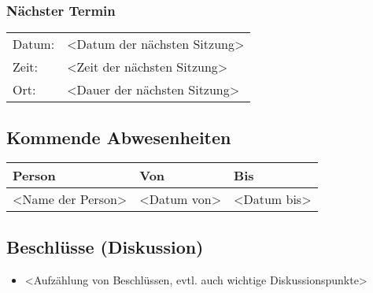 \subsubsection*{Nächster Termin}

\begin{tabular}{p{4cm} p{12cm}}
    Datum: & <Datum der nächsten Sitzung> \\
    Zeit: & <Zeit der nächsten Sitzung> \\
    Ort: & <Dauer der nächsten Sitzung> \\
\end{tabular}

\vspace{1cm}

\subsection*{Kommende Abwesenheiten}
\begin{table}[H]
    \centering
    \begin{tabular}{p{6cm} p{5cm} p{5cm}}
        \textbf{Person} & \textbf{Von} & \textbf{Bis} \\ \hline
        <Name der Person> & <Datum von> & <Datum bis> \\ \hline
    \end{tabular}
\end{table}

\subsection*{Beschlüsse (Diskussion)}
\begin{itemize}
    \item <Aufzählung von Beschlüssen, evtl. auch wichtige Diskussionspunkte>
\end{itemize}

